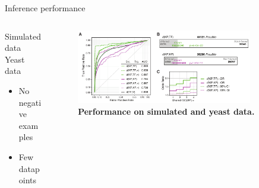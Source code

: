 \begin{frame}{Inference performance}
\begin{columns}
\begin{column}{0.2\textwidth}
Simulated data 
Yeast data
\begin{itemize}
    \item No negative examples
    \item Few datapoints
\end{itemize}
\end{column}

\begin{column}{0.8\textwidth}
\begin{figure}[ht]
    \centering
    \includegraphics[width=0.85\textwidth]{analysis/fig/Fig3.pdf}
    \caption{\textbf{Performance on simulated and yeast data.} \\  }
    \label{fig:minimum_performance}
\end{figure}
\end{column}
\end{columns}
\end{frame}
